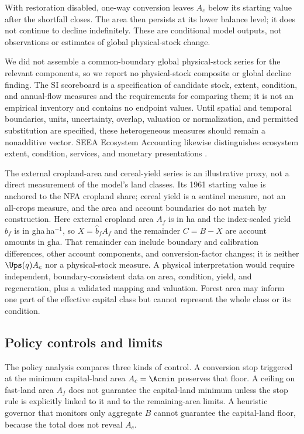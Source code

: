 With restoration disabled, one-way conversion leaves $A_c$ below its starting value after the shortfall closes. The area then persists at its lower balance level; it does not continue to decline indefinitely. These are conditional model outputs, not observations or estimates of global physical-stock change.

We did not assemble a common-boundary global physical-stock series for the relevant components, so we report no physical-stock composite or global decline finding. The SI scoreboard is a specification of candidate stock, extent, condition, and annual-flow measures and the requirements for comparing them; it is not an empirical inventory and contains no endpoint values. Until spatial and temporal boundaries, units, uncertainty, overlap, valuation or normalization, and permitted substitution are specified, these heterogeneous measures should remain a nonadditive vector. SEEA Ecosystem Accounting likewise distinguishes ecosystem extent, condition, services, and monetary presentations \citep{UN2021SEEA_EA}.

The external cropland-area and cereal-yield series is an illustrative proxy, not a direct measurement of the model's land classes. Its 1961 starting value is anchored to the NFA cropland share; cereal yield is a sentinel measure, not an all-crops measure, and the area and account boundaries do not match by construction. Here external cropland area $A_f$ is in ha and the index-scaled yield $\hat b_f$ is in gha\,ha$^{-1}$, so $X=\hat b_fA_f$ and the remainder $C=B-X$ are account amounts in gha. That remainder can include boundary and calibration differences, other account components, and conversion-factor changes; it is neither $\Ups(q)A_c$ nor a physical-stock measure. A physical interpretation would require independent, boundary-consistent data on area, condition, yield, and regeneration, plus a validated mapping and valuation. Forest area may inform one part of the effective capital class but cannot represent the whole class or its condition.

\subsection{Policy controls and limits}

The policy analysis compares three kinds of control. A conversion stop triggered at the minimum capital-land area $A_c=\Acmin$ preserves that floor. A ceiling on fast-land area $A_f$ does not guarantee the capital-land minimum unless the stop rule is explicitly linked to it and to the remaining-area limits. A heuristic governor that monitors only aggregate $B$ cannot guarantee the capital-land floor, because the total does not reveal $A_c$.

